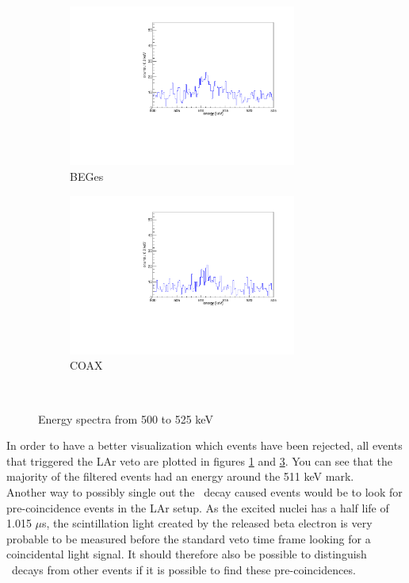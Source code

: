 \documentclass[encoding=utf8,british]{tumphthesis}
\begin{document}
\begin{figure}[t!]
	\centering
	\begin{subfigure}{.5\textwidth}
		\includegraphics[width=75mm]{./Bilder/AntiLArBEGe.pdf}
		\caption{BEGes}
		\label{fig:AntiLArBEGes}
	\end{subfigure}\hfill%
	\begin{subfigure}{.5\textwidth}
		\includegraphics[width=75mm]{./Bilder/AntiLArCOAX.pdf}
		\caption{COAX}
		\label{fig:AntiLArCOAX}
	\end{subfigure}
	\\
	\vspace{0.5cm}
	\caption{Energy spectra from 500 to 525 keV }
\end{figure}

In order to have a better visualization which events have been rejected, all events that triggered the LAr veto are plotted in figures \ref{fig:AntiLArBEGes} and \ref{fig:AntiLArCOAX}.
You can see that the majority of the filtered events had an energy around the 511 keV mark.
\\

Another way to possibly single out the \Kr\ decay caused events would be to look for pre-coincidence events in the LAr setup.
As the excited  nuclei has a half life of 1.015 $\mu$s, the scintillation light created by the released beta electron is very probable to be measured before the standard veto time frame looking for a coincidental light signal.
It should therefore also be possible to distinguish \Kr\ decays from other events if it is possible to find these pre-coincidences.
\\
\end{document}
